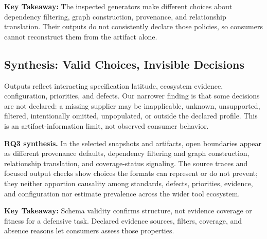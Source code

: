\begin{tcolorbox}[colback=gray!4!white, colframe=black!80, boxrule=0.5pt, arc=5pt, left=2pt, right=2pt, top=1pt, bottom=1pt]
\textbf{Key Takeaway:} The inspected generators make different choices about dependency filtering, graph construction, provenance, and relationship translation. Their outputs do not consistently declare those policies, so consumers cannot reconstruct them from the artifact alone.
\end{tcolorbox}

\subsection{Synthesis: Valid Choices, Invisible Decisions}
Outputs reflect interacting specification latitude, ecosystem evidence, configuration, priorities, and defects. Our narrower finding is that some decisions are not declared: a missing supplier may be inapplicable, unknown, unsupported, filtered, intentionally omitted, unpopulated, or outside the declared profile. This is an artifact-information limit, not observed consumer behavior.

\textbf{RQ3 synthesis.} In the selected snapshots and artifacts, open boundaries appear as different provenance defaults, dependency filtering and graph construction, relationship translation, and coverage-status signaling. The source traces and focused output checks show choices the formats can represent or do not prevent; they neither apportion causality among standards, defects, priorities, evidence, and configuration nor estimate prevalence across the wider tool ecosystem.

\begin{tcolorbox}[colback=gray!4!white, colframe=black!80, boxrule=0.5pt, arc=5pt, left=2pt, right=2pt, top=1pt, bottom=1pt]
\textbf{Key Takeaway:} Schema validity confirms structure, not evidence coverage or fitness for a defensive task. Declared evidence sources, filters, coverage, and absence reasons let consumers assess those properties.
\end{tcolorbox}
